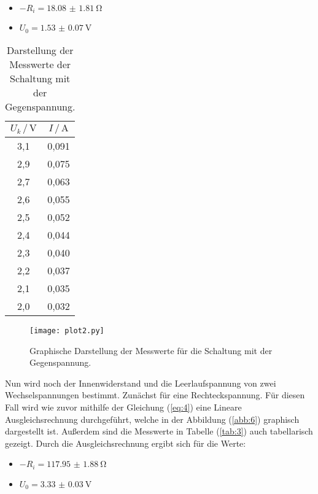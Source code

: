 \begin{itemize}
  \item $-R_i = \SI{18.08(181)}{\ohm}$
  \item $U_0 = \SI{1.53(7)}{\volt}$
\end{itemize}

\begin{table}[H]
  \centering
  \caption{Darstellung der Messwerte der Schaltung mit der Gegenspannung.}
  \label{tab:2}
  \begin{tabular}{c c}
    \toprule
    $U_k \, / \, \si{\volt}$ & $ I \, / \, \si{\ampere}$ \\
    \midrule
    3,1 & 0,091 \\
    2,9 & 0,075 \\
    2,7 & 0,063 \\
    2,6 & 0,055 \\
    2,5 & 0,052 \\
    2,4 & 0,044 \\
    2,3 & 0,040 \\
    2,2 & 0,037 \\
    2,1 & 0,035 \\
    2,0 & 0,032 \\
    \bottomrule
  \end{tabular}
\end{table}

\begin{figure}[H]
  \centering
  \texttt{[image: plot2.py]}
  \caption{Graphische Darstellung der Messwerte für die Schaltung mit der Gegenspannung.}
  \label{abb:5}
\end{figure}

Nun wird noch der Innenwiderstand und die Leerlaufspannung von zwei Wechselspannungen bestimmt.
Zunächst für eine Rechteckspannung. Für diesen Fall wird wie zuvor mithilfe der Gleichung
(\ref{eq:4}) eine Lineare Ausgleichsrechnung durchgeführt, welche in der Abbildung
(\ref{abb:6}) graphisch dargestellt ist. Außerdem sind die Messwerte in Tabelle (\ref{tab:3})
auch tabellarisch gezeigt.
Durch die Ausgleichsrechnung ergibt sich für die Werte:

\begin{itemize}
  \item $-R_i = \SI{117.95(188)}{\ohm}$
  \item $U_0 = \SI{3.33(3)}{\volt}$
\end{itemize}

